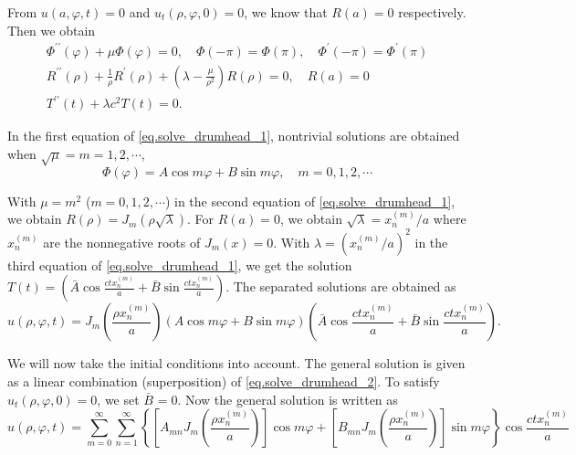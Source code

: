 From $u(a, \varphi, t)=0$ and $u_t(\rho, \varphi, 0)=0$, we know that $R(a) = 0$ respectively. Then we obtain
\begin{equation}\label{eq.solve_drumhead_1}
\begin{array}{l}
    \Phi^{\prime \prime}(\varphi)+\mu \Phi(\varphi)=0, \quad \Phi(-\pi)=\Phi(\pi), \quad \Phi^{\prime}(-\pi)=\Phi^{\prime}(\pi) \\
    R^{\prime \prime}(\rho)+\frac{1}{\rho} R^{\prime}(\rho)+\left(\lambda-\frac{\mu}{\rho^2}\right) R(\rho)=0, \quad R(a)=0 \\
    T^{\prime \prime}(t)+\lambda c^2 T(t)=0.
\end{array}
\end{equation}


In the first equation of \eqref{eq.solve_drumhead_1}, nontrivial solutions are obtained when $\sqrt{\mu} = m = 1,2, \cdots$,
$$
\Phi(\varphi)=A \cos m \varphi+B \sin m \varphi, \quad m=0,1,2, \cdots
$$


With $\mu=m^2$ ($m=0,1,2, \cdots$) in the second equation of \eqref{eq.solve_drumhead_1}, we obtain $R(\rho)=J_m(\rho \sqrt{\lambda})$. For $R(a)=0$, we obtain $\sqrt{\lambda}=x_n^{(m)} / a$ where $x_n^{(m)}$ are the nonnegative roots of $J_m(x)=0$. With $\lambda = \left(x_n^{(m)} / a\right)^2$ in the third equation of \eqref{eq.solve_drumhead_1}, we get the solution $T(t) = \left(\bar{A} \cos \frac{c t x_n^{(m)}}{a}+\bar{B} \sin \frac{c t x_n^{(m)}}{a}\right)$. The separated solutions are obtained as
\begin{equation}\label{eq.solve_drumhead_2}
    u(\rho, \varphi, t)=J_m\left(\frac{\rho x_n^{(m)}}{a}\right)(A \cos m \varphi+B \sin m \varphi)\left(\bar{A} \cos \frac{c t x_n^{(m)}}{a}+\bar{B} \sin \frac{c t x_n^{(m)}}{a}\right) .
\end{equation}


We will now take the initial conditions into account. The general solution is given as a linear combination (superposition) of \eqref{eq.solve_drumhead_2}. To satisfy $u_t(\rho, \varphi, 0)=0$, we set $\bar{B}_{}=0$. Now the general solution is written as
\begin{equation}\label{eq.solve_drumhead_3}
    u(\rho, \varphi, t)=\sum_{m=0}^{\infty} \sum_{n=1}^{\infty}\left\{\left[A_{m n} J_m\left(\frac{\rho x_n^{(m)}}{a}\right)\right] \cos m \varphi+\left[B_{m n} J_m\left(\frac{\rho x_n^{(m)}}{a}\right)\right] \sin m \varphi\right\} \cos \frac{c t x_n^{(m)}}{a}
\end{equation}

